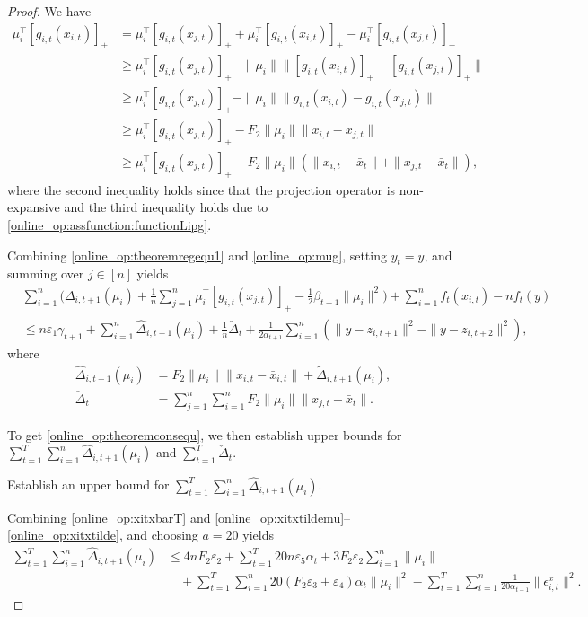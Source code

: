 \documentclass[12pt,draftcls,onecolumn]{IEEEtran}%
\begin{document}
\begin{proof}
We have
\begin{align}\label{online_op:mug}
\mu_i^\top[g_{i,t}(x_{i,t})]_+
&=\mu_i^\top[g_{i,t}(x_{j,t})]_+
+\mu_i^\top[g_{i,t}(x_{i,t})]_+-\mu_i^\top[g_{i,t}(x_{j,t})]_+\nonumber\\
&\ge\mu_i^\top[g_{i,t}(x_{j,t})]_+
-\|\mu_i\|\|[g_{i,t}(x_{i,t})]_+-[g_{i,t}(x_{j,t})]_+\|\nonumber\\
&\ge\mu_i^\top[g_{i,t}(x_{j,t})]_+
-\|\mu_i\|\|g_{i,t}(x_{i,t})-g_{i,t}(x_{j,t})\|\nonumber\\
&\ge\mu_i^\top[g_{i,t}(x_{j,t})]_+
-F_2\|\mu_i\|\|x_{i,t}-x_{j,t}\|\nonumber\\
&\ge\mu_i^\top[g_{i,t}(x_{j,t})]_+
-F_2\|\mu_i\|(\|x_{i,t}-\bar{x}_{t}\|+\|x_{j,t}-\bar{x}_{t}\|),
\end{align}
where the second inequality holds since that the projection operator is non-expansive and the third inequality holds due to \eqref{online_op:assfunction:functionLipg}.

Combining \eqref{online_op:theoremregequ1} and \eqref{online_op:mug}, setting $y_t=y$, and summing over $j\in[n]$ yields
\begin{align}\label{online_op:theoremregequ1_g}
&\sum_{i=1}^n\Big(\Delta_{i,t+1}(\mu_i)+\frac{1}{ n}\sum_{j=1}^n\mu_i^\top[g_{i,t}(x_{j,t})]_+
-\frac{1}{2}\beta_{t+1}\|\mu_i\|^2\Big)+\sum_{i=1}^nf_{t}(x_{i,t})
-nf_{t}(y)\nonumber\\
&\le n\varepsilon_1\gamma_{t+1}+\sum_{i=1}^n\hat{\Delta}_{i,t+1}(\mu_i)
+\frac{1}{ n}\check{\Delta}_t+\frac{1}{ 2\alpha_{t+1}}\sum_{i=1}^n(\|y-z_{i,t+1}\|^2-\|y-z_{i,t+2}\|^2),
\end{align}
where
\begin{align*}
\hat{\Delta}_{i,t+1}(\mu_i)
&=F_2\|\mu_i\|\|x_{i,t}-\bar{x}_{i,t}\|+\tilde{\Delta}_{i,t+1}(\mu_i),\\
\check{\Delta}_t&=\sum_{j=1}^n\sum_{i=1}^nF_2\|\mu_i\|\|x_{j,t}-\bar{x}_{t}\|.
\end{align*}

To get \eqref{online_op:theoremconsequ}, we then establish upper bounds for $\sum_{t=1}^{T}\sum_{i=1}^n\hat{\Delta}_{i,t+1}(\mu_i)$ and $\sum_{t=1}^{T}\check{\Delta}_t$.

 Establish an upper bound for $\sum_{t=1}^{T}\sum_{i=1}^n\hat{\Delta}_{i,t+1}(\mu_i)$.

Combining \eqref{online_op:xitxbarT} and \eqref{online_op:xitxtildemu}--\eqref{online_op:xitxtilde}, and choosing $a=20$ yields
\begin{align}\label{online_op:xitxtilde2_g}
\sum_{t=1}^{T}\sum_{i=1}^n\hat{\Delta}_{i,t+1}(\mu_i)
&\le 4nF_2\varepsilon_2+\sum_{t=1}^{T}20n\varepsilon_5\alpha_{t}+
3F_2\varepsilon_2\sum_{i=1}^n\|\mu_i\|\nonumber\\
&\quad+\sum_{t=1}^{T}\sum_{i=1}^n20(F_2\varepsilon_3+\varepsilon_4)\alpha_{t}\|\mu_i\|^2 -\sum_{t=1}^{T}\sum_{i=1}^n\frac{1}{20\alpha_{t+1}}\|\epsilon^x_{i,t}\|^2.
\end{align}



\end{proof}
\end{document}
